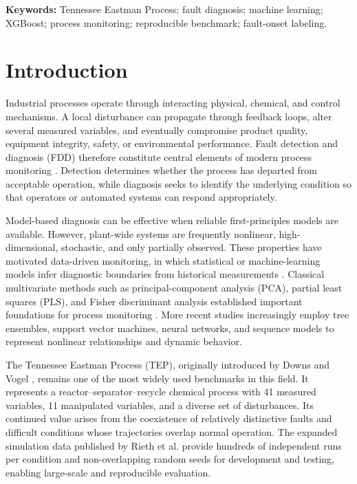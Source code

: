 \documentclass[12pt,a4paper]{article}
\begin{document}
\noindent\textbf{Keywords:} Tennessee Eastman Process; fault diagnosis;
machine learning; XGBoost; process monitoring; reproducible benchmark;
fault-onset labeling.

\section{Introduction}

Industrial processes operate through interacting physical, chemical, and
control mechanisms. A local disturbance can propagate through feedback loops,
alter several measured variables, and eventually compromise product quality,
equipment integrity, safety, or environmental performance. Fault detection and
diagnosis (FDD) therefore constitute central elements of modern process
monitoring \cite{venkatasubramanian2003review,yin2014review,ji2022review}.
Detection determines whether the process has departed from acceptable
operation, while diagnosis seeks to identify the underlying condition so that
operators or automated systems can respond appropriately.

Model-based diagnosis can be effective when reliable first-principles models
are available. However, plant-wide systems are frequently nonlinear,
high-dimensional, stochastic, and only partially observed. These properties
have motivated data-driven monitoring, in which statistical or machine-learning
models infer diagnostic boundaries from historical measurements
\cite{chiang2001book,yin2014review}. Classical multivariate methods such as
principal-component analysis (PCA), partial least squares (PLS), and Fisher
discriminant analysis established important foundations for process monitoring
\cite{chiang2000discriminant}. More recent studies increasingly employ tree
ensembles, support vector machines, neural networks, and sequence models to
represent nonlinear relationships and dynamic behavior.

The Tennessee Eastman Process (TEP), originally introduced by Downs and Vogel
\cite{downs1993tep}, remains one of the most widely used benchmarks in this
field. It represents a reactor--separator--recycle chemical process with 41
measured variables, 11 manipulated variables, and a diverse set of disturbances.
Its continued value arises from the coexistence of relatively distinctive
faults and difficult conditions whose trajectories overlap normal operation.
The expanded simulation data published by Rieth et al. \cite{rieth2017data}
provide hundreds of independent runs per condition and non-overlapping random
seeds for development and testing, enabling large-scale and reproducible
evaluation.
\end{document}
